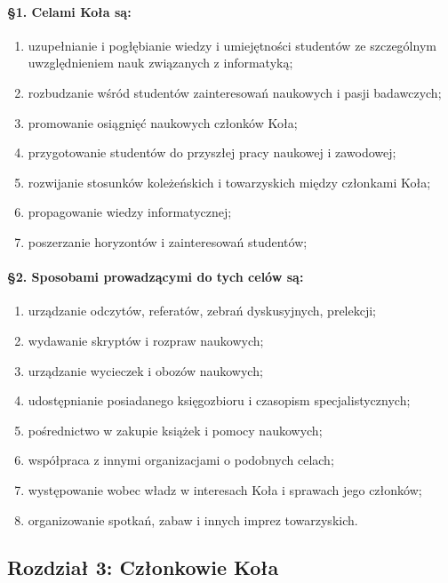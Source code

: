 \documentclass{article}
\begin{document}
	\paragraph{\S 1. Celami Koła są:}
		\begin{enumerate}
			\item uzupełnianie i pogłębianie wiedzy i umiejętności studentów ze szczególnym uwzględnieniem nauk związanych z informatyką;
			\item rozbudzanie wśród studentów zainteresowań naukowych i pasji badawczych;
			\item promowanie osiągnięć naukowych członków Koła;
			\item przygotowanie studentów do przyszłej pracy naukowej i zawodowej;
			\item rozwijanie stosunków koleżeńskich i towarzyskich między członkami Koła;
			\item propagowanie wiedzy informatycznej;
			\item poszerzanie horyzontów i zainteresowań studentów;
		\end{enumerate}
	

	\paragraph{\S 2. Sposobami prowadzącymi do tych celów są:}
\begin{enumerate}
			\item urządzanie odczytów, referatów, zebrań dyskusyjnych, prelekcji;
			\item wydawanie skryptów i rozpraw naukowych;
			\item urządzanie wycieczek i obozów naukowych;
			\item udostępnianie posiadanego księgozbioru i czasopism specjalistycznych;
			\item pośrednictwo w zakupie książek i pomocy naukowych;
			\item współpraca z innymi organizacjami o podobnych celach;
			\item występowanie wobec władz w interesach Koła i sprawach jego członków;
			\item organizowanie spotkań, zabaw i innych imprez towarzyskich.
		\end{enumerate}

\vspace{0.4cm}
\begin{center}
    \section*{Rozdział 3: Członkowie Koła}
\end{center}\vspace{0.4cm}
\end{document}
